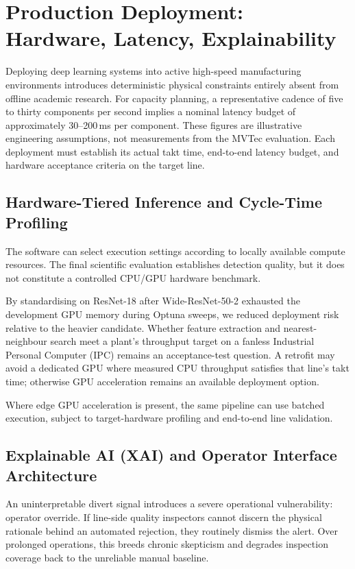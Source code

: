 \section{Production Deployment: Hardware, Latency, Explainability}
\label{sec:deployment}

Deploying deep learning systems into active high-speed manufacturing environments introduces deterministic physical constraints entirely absent from offline academic research. For capacity planning, a representative cadence of five to thirty components per second implies a nominal latency budget of approximately 30--200\,ms per component. These figures are illustrative engineering assumptions, not measurements from the MVTec evaluation. Each deployment must establish its actual takt time, end-to-end latency budget, and hardware acceptance criteria on the target line.

\subsection{Hardware-Tiered Inference and Cycle-Time Profiling}

The software can select execution settings according to locally available compute resources. The final scientific evaluation establishes detection quality, but it does not constitute a controlled CPU/GPU hardware benchmark.

By standardising on ResNet-18 after Wide-ResNet-50-2 exhausted the development GPU memory during Optuna sweeps, we reduced deployment risk relative to the heavier candidate. Whether feature extraction and nearest-neighbour search meet a plant's throughput target on a fanless Industrial Personal Computer (IPC) remains an acceptance-test question. A retrofit may avoid a dedicated GPU where measured CPU throughput satisfies that line's takt time; otherwise GPU acceleration remains an available deployment option.

Where edge GPU acceleration is present, the same pipeline can use batched execution, subject to target-hardware profiling and end-to-end line validation.

\subsection{Explainable AI (XAI) and Operator Interface Architecture}

An uninterpretable divert signal introduces a severe operational vulnerability: operator override. If line-side quality inspectors cannot discern the physical rationale behind an automated rejection, they routinely dismiss the alert. Over prolonged operations, this breeds chronic skepticism and degrades inspection coverage back to the unreliable manual baseline.

